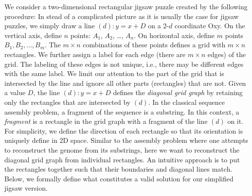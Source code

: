 \documentclass[a4paper]{article}
\begin{document}
We consider a two-dimensional rectangular jigsaw puzzle created by the following procedure:
In stead of a complicated picture as it is usually the case for jigsaw puzzles, we simply draw a line $(d): y = x + D$ on a 2-$d$ coordinate Oxy.
On the vertical axis, define $n$ points: $A_1$, $A_2$, \ldots, $A_n$. On horizontal axis, define $m$ points
$B_1, B_2, \ldots, B_m$. The $m\times n$ combinations of these points defines a grid with $m\times n$ rectangles.  We further assign a label for each edge (there are
$m\times n$ edges) of the grid. The labeling of these edges is not unique, i.e., there may be different edges with the same label. We limit our attention to the
part of the grid that is intersected by the line and ignore all other parts (rectangles) that are not.
Given a value $D$,  the line $(d): y = x + D$ defines the \emph{diagonal grid graph} by retaining only the rectangles that are intersected by $(d)$.
In the classical sequence assembly problem, a fragment of the sequence is a substring. In this context, a \emph{fragment} is a
rectangle in the grid graph with a fragment of the line $(d)$ on it. For simplicity, we define the direction of each rectangle so that its orientation
is uniquely define in 2D space. Similar to the assembly problem where one attempts to reconstruct the genome from its
substrings, here we want to reconstruct the diagonal grid graph from individual rectangles.
An intuitive approach is to put the rectangles together such that their boundaries and diagonal lines match. Below, we formally define what constitutes
a valid solution for our simplified jigsaw version.
\end{document}
